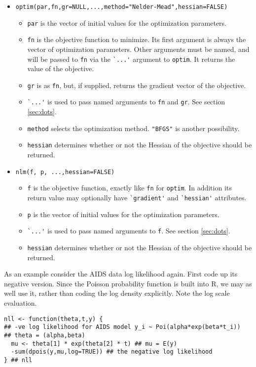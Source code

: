 \documentclass[10pt] {article}
\theoremstyle{definition}
\begin{document}
\begin{itemize}
\item \verb+optim(par,fn,gr=NULL,...,method="Nelder-Mead",hessian=FALSE)+
 \begin{itemize}
 \item {\tt par} is the vector of initial values for the optimization parameters.
 \item \verb+fn+ is the objective function to minimize. Its first argument is always the vector of optimization parameters. Other arguments must be named, and will be passed to {\tt fn} via the \verb+`...'+ argument to {\tt optim}. It returns the value of the objective.
 \item \verb+gr+ is as {\tt fn}, but, if supplied, returns the gradient vector of the objective.
 \item \verb+`...'+ is used to pass named arguments to {\tt  fn} and {\tt gr}. See section \ref{sec:dots}. 
 \item {\tt method} selects the optimization method. \verb+"BFGS"+ is another possibility.
 \item {\tt hessian} determines whether or not the Hessian of the objective should be returned. 
 \end{itemize}
 \item \verb+nlm(f, p, ...,hessian=FALSE)+
 \begin{itemize}
 \item \verb+f+ is the objective function, exactly like {\tt fn} for {\tt optim}. In addition its return value may optionally have \verb+`gradient'+ and \verb+`hessian'+ attributes.
 \item {\tt p} is the vector of initial values for the optimization parameters.
 \item \verb+`...'+ is used to pass named arguments to {\tt  f}. See section \ref{sec:dots}.  
 \item {\tt hessian} determines whether or not the Hessian of the objective should be returned. 
\end{itemize}\end{itemize}

As an example consider the AIDS data log likelihood again. First code up its negative version. Since the Poisson probability function is built into R, we may as well use it, rather than coding the log density explicitly. Note the log scale evaluation.
\begin{lstlisting}
nll <- function(theta,t,y) {
## -ve log likelihood for AIDS model y_i ~ Poi(alpha*exp(beta*t_i))
## theta = (alpha,beta)  
  mu <- theta[1] * exp(theta[2] * t) ## mu = E(y)
  -sum(dpois(y,mu,log=TRUE)) ## the negative log likelihood
} ## nll
\end{lstlisting} 
\end{document}
